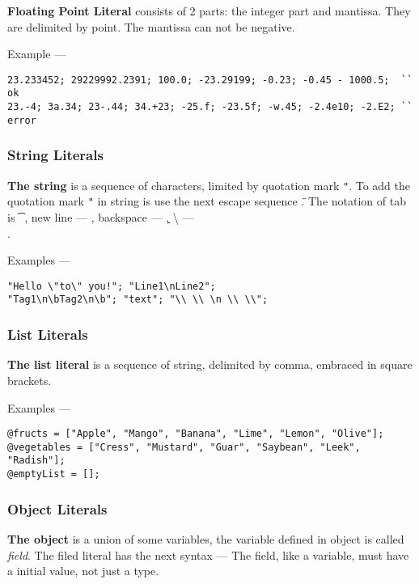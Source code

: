 {\bf Floating Point Literal} consists of 2 parts: the integer part and mantissa. They are delimited by point. The mantissa can not be negative.

Example —
\begin{verbatim}
23.233452; 29229992.2391; 100.0; -23.29199; -0.23; -0.45 - 1000.5;  `` ok
23.-4; 3a.34; 23-.44; 34.+23; -25.f; -23.5f; -w.45; -2.4e10; -2.E2; `` error
\end{verbatim}

\subsubsection{String Literals}

{\bf The string} is a sequence of characters, limited by quotation mark \texttt{"}. To add the quotation mark \texttt{"} in string is use the next escape sequence \texttt{\"}. The notation of tab is \texttt{\t}, new line — \texttt{\n}, backspace — \texttt{\b}, \textbackslash{} — \texttt{\\}.

Examples —
\begin{verbatim}
"Hello \"to\" you!"; "Line1\nLine2";
"Tag1\n\bTag2\n\b"; "text"; "\\ \\ \n \\ \\";
\end{verbatim}

\subsubsection{List Literals}

{\bf The list literal} is a sequence of string, delimited by comma, embraced in square brackets.

Examples —
\begin{verbatim}
@fructs = ["Apple", "Mango", "Banana", "Lime", "Lemon", "Olive"];
@vegetables = ["Cress", "Mustard", "Guar", "Saybean", "Leek", "Radish"];
@emptyList = [];
\end{verbatim}

\subsubsection{Object Literals}

{\bf The object} is a union of some variables, the variable defined in object is called {\it field}. The filed literal has the next syntax —
The field, like a variable, must have a initial value, not just a type.

